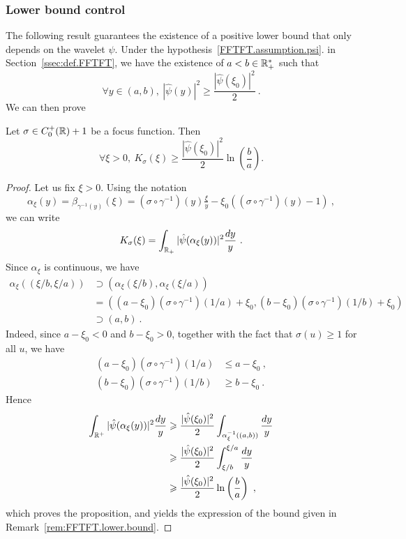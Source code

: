 \subsubsection{Lower bound control}

The following result guarantees the existence of a positive lower bound that only depends on the wavelet $\psi$. Under the hypothesis~\ref{FFTFT.assumption.psi}. in Section~\ref{ssec:def.FFTFT}, we have the existence of $a<b\in\mathbb{R}_+^*$ such that
\begin{equation}
        \forall y\in (a,b),\ |\hat{\psi}(y)|^2 \geqslant \frac{|\hat{\psi}(\xi_0)|^2}2\ .
\end{equation}
We can then prove
\begin{prop}\label{prop_lower_bound_kernel_basic}
Let $\sigma\in C_0^+(\mathbb{R})+1$ be a focus function. 
Then
    \begin{equation}
        \forall \xi>0, \ K_{\sigma}(\xi)\geqslant \frac{|\hat{\psi}(\xi_0)|^2}{2}\ln\left(\frac{b}{a}\right).
    \end{equation}
\end{prop}

\begin{proof}
    Let us fix $\xi>0$. Using the notation 
    \[
    \alpha_\xi(y)=\beta_{\gamma^{-1}(y)}(\xi) = \left(\sigma\circ\gamma^{-1}\right)(y)\tfrac{\xi}{y}-\xi_0\left(\left(\sigma\circ\gamma^{-1}\right)(y)-1\right)\ ,
    \]
    we can write
    \begin{equation*}
        K_\sigma(\xi)= \int_{\mathbb{R}_+} |\hat{\psi}(\alpha_\xi(y))|^2\frac{dy}{y}\ .
    \end{equation*}
    Since $\alpha_\xi$ is continuous, we have
    \begin{align*}
        \alpha_\xi((\xi/b,\xi/a))&\supset \left(\alpha_\xi(\xi/b),\alpha_\xi(\xi/a)\right) \\
        & = \left((a-\xi_0)\left(\sigma\circ\gamma^{-1}\right)(1/a)+\xi_0 , (b-\xi_0)\left(\sigma\circ\gamma^{-1}\right)(1/b)+\xi_0 \right)\\
        & \supset (a,b)\ .
    \end{align*}
    Indeed, since $a-\xi_0<0$ and $b-\xi_0>0$, together with the fact that $\sigma(u)\ge 1$ for all $u$, we have 
    \begin{align*}
        (a-\xi_0)\left(\sigma\circ\gamma^{-1}\right)(1/a) &\leqslant a-\xi_0 \ , \\
        (b-\xi_0)\left(\sigma\circ\gamma^{-1}\right)(1/b) &\geqslant b-\xi_0 \ .
    \end{align*}
    Hence
    \begin{align*}
        \int_{\mathbb{R}^+} |\hat{\psi}(\alpha_\xi(y))|^2\frac{dy}{y} &\geqslant \frac{|\hat{\psi}(\xi_0)|^2}{2}\int_{\alpha_\xi^{-1}((a,b))}\frac{dy}{y} \\
        & \geqslant \frac{|\hat{\psi}(\xi_0)|^2}{2} \int_{\xi/b}^{\xi/a}\frac{dy}{y} \\
        & \geqslant \frac{|\hat{\psi}(\xi_0)|^2}{2}\ln\left(\frac{b}{a}\right)\ ,
    \end{align*}
    which proves the proposition, and yields the expression of the bound given in Remark~\ref{rem:FFTFT.lower.bound}.
\end{proof}



